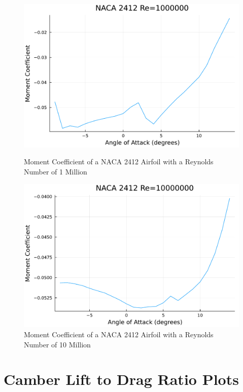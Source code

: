 \documentclass{article}
\begin{document}
\begin{figure}[h]
    \centering
\begin{minipage}[b]{0.45\textwidth}
\centering
\includegraphics[width=\textwidth]{NACA 2412 Re=1000000_Moment_Coefficent_Plot.pdf}
\caption{\label{fig:NACA 2412 Moment Re=1000000}Moment Coefficient of a NACA 2412 Airfoil with a Reynolds Number of 1 Million}
\end{minipage}
\begin{minipage}[b]{0.45\textwidth}
\centering
\includegraphics[width=\textwidth]{NACA 2412 Re=10000000_Moment_Coefficent_Plot.pdf}
\caption{\label{fig:NACA 2412 Moment Re=10000000}Moment Coefficient of a NACA 2412 Airfoil with a Reynolds Number of 10 Million}
\end{minipage}
\end{figure}

\section{Camber Lift to Drag Ratio Plots}
\label{sec:first_appendix}
\end{document}

